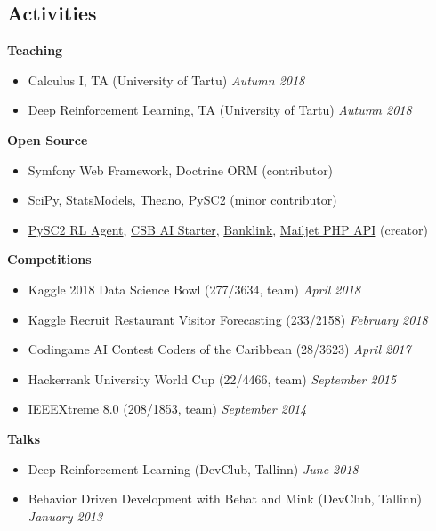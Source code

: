 \documentclass[margin,line]{res}
\begin{document}
\begin{resume}
\section{\sc Activities}
{\bf Teaching}
\begin{itemize}
    \item[ ] Calculus I, TA (University of Tartu) \hfill {\it Autumn 2018}
    \item[ ] Deep Reinforcement Learning, TA (University of Tartu) \hfill {\it Autumn 2018}
\end{itemize}
\vspace*{-.1in}
{\bf Open Source}
\begin{itemize}
    \item[ ] Symfony Web Framework, Doctrine ORM (contributor)
    \item[ ] SciPy, StatsModels, Theano, PySC2 (minor contributor)
    \item[ ] \href{https://github.com/Inoryy/pysc2-rl-agent}{PySC2 RL Agent}, \href{https://github.com/Inoryy/csb-ai-starter}{CSB AI Starter}, \href{https://github.com/Inoryy/Banklink}{Banklink}, \href{https://github.com/KnpLabs/mailjet-api-php}{Mailjet PHP API} (creator)
\end{itemize}
\vspace*{-.1in}
{\bf Competitions}
\begin{itemize}
\item[ ] Kaggle 2018 Data Science Bowl (277/3634, team) \hfill {\it April 2018}
\item[ ] Kaggle Recruit Restaurant Visitor Forecasting (233/2158) \hfill {\it February 2018}
\item[ ] Codingame AI Contest Coders of the Caribbean (28/3623) \hfill {\it April 2017}
\item[ ] Hackerrank University World Cup (22/4466, team) \hfill {\it September 2015}
\item[ ] IEEEXtreme 8.0 (208/1853, team) \hfill {\it September 2014}
\end{itemize}
\vspace*{-.1in}
{\bf Talks}
\begin{itemize}
    \item[ ] Deep Reinforcement Learning (DevClub, Tallinn) \hfill {\it June 2018}
    \item[ ] Behavior Driven Development with Behat and Mink (DevClub, Tallinn) \hfill {\it January 2013}
\end{itemize}


\end{resume}
\end{document}
